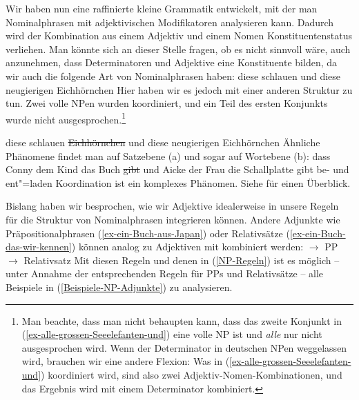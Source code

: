 Wir haben nun eine raffinierte kleine Grammatik entwickelt, mit der man Nominalphrasen mit
adjektivischen Modifikatoren analysieren kann. Dadurch wird der Kombination aus einem Adjektiv und einem Nomen Konstituenten\-status
verliehen. Man könnte sich an dieser Stelle fragen, ob es nicht sinnvoll wäre, auch anzunehmen, dass Determinatoren und
Adjektive eine Konstituente bilden, da wir auch die folgende Art von Nominalphrasen haben:
\ea
diese schlauen und diese neugierigen Eichhörnchen
\z
Hier haben wir es jedoch mit einer anderen Struktur zu tun. Zwei volle NPen wurden
koordiniert, und ein Teil des ersten Konjunkts wurde nicht ausgesprochen.\footnote{
  Man beachte, dass man nicht behaupten kann, dass das zweite Konjunkt in (\ref{ex-alle-grossen-Seeelefanten-und})
  eine volle NP ist und \emph{alle} nur nicht ausgesprochen wird. Wenn der Determinator in deutschen
  NPen weggelassen wird, brauchen wir eine andere Flexion:
\eal
{}
\zl
Was in (\ref{ex-alle-grossen-Seeelefanten-und}) koordiniert wird, sind also zwei Adjektiv-Nomen-Kombinationen,
und das Ergebnis wird mit einem Determinator kombiniert.
}

\ea
diese schlauen \st{Eichhörnchen} und diese neugierigen Eichhörnchen
\z
Ähnliche Phänomene findet man auf Satzebene (a) und sogar auf Wortebene (b):
\eal
\ex
dass Conny dem Kind das Buch \st{gibt} und Aicke der Frau die Schallplatte gibt
\ex
be- und ent"=laden
\zl
Koordination ist ein komplexes Phänomen. Siehe  für einen Überblick.


Bislang haben wir besprochen, wie wir Adjektive idealerweise in unsere Regeln für die Struktur von Nominalphrasen integrieren können.
Andere Adjunkte wie Präpositionalphrasen (\ref{ex-ein-Buch-aus-Japan}) oder Relativsätze (\ref{ex-ein-Buch-das-wir-kennen}) können analog zu Adjektiven mit \nbar kombiniert werden:
\eal
\ex\label{xbar-PP-Adjunkt-an-N} \nbar $\to$ \nbar PP
\ex \nbar $\to$ \nbar Relativsatz
\zl
Mit diesen Regeln und denen in (\ref{NP-Regeln}) ist es möglich -- unter Annahme der entsprechenden Regeln für PPs und
Relativsätze -- alle Beispiele in (\ref{Beispiele-NP-Adjunkte}) zu analysieren.

